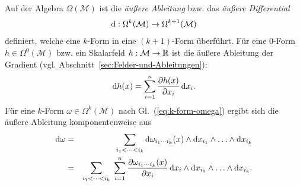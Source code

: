 Auf der Algebra $\Omega(\mathcal{M})$ ist die \emph{äußere Ableitung}
bzw. das \emph{äußere Differential}
\[
{\mathrm{d}}:\Omega^{k}(\mathcal{M})\to\Omega^{k+1}(\mathcal{M})
\]
definiert, welche eine $k$-Form in eine $(k+1)$-Form überführt.
Für eine $0$-Form $h\in\Omega^{0}(\mathcal{M})$ bzw. ein Skalarfeld
$h:\mathcal{M}\to{\mathbb{R}}$ ist die äußere Ableitung der Gradient (vgl.
Abschnitt~\ref{sec:Felder-und-Ableitungen}): 
\begin{equation}
{\mathrm{d}} h(x)=\sum_{i=1}^{n}\frac{\partial h(x)}{\partial x_{i}}\,{\mathrm{d}} x_{i}.\label{eq:formen-ableitung-0-form}
\end{equation}
Für eine $k$-Form $\omega\in\Omega^{k}(\mathcal{M})$ nach Gl.~(\ref{eq:k-form-omega})
ergibt sich die äußere Ableitung komponentenweise aus 
\begin{eqnarray}
{\mathrm{d}}\omega & = & \sum_{i_{1}<\cdots<i_{k}}{\mathrm{d}}\omega_{i_{1}\cdots i_{k}}(x)\wedge{\mathrm{d}} x_{i_{1}}\wedge\ldots\wedge{\mathrm{d}} x_{i_{k}}\nonumber \\
 & = & \sum_{i_{1}<\cdots<i_{k}}\;\sum_{i=1}^{n}\frac{\partial\omega_{i_{1}\cdots i_{k}}(x)}{\partial x_{i}}\,{\mathrm{d}} x_{i}\wedge{\mathrm{d}} x_{i_{1}}\wedge\ldots\wedge{\mathrm{d}} x_{i_{k}}.\label{eq:formen-def-ableitung}
\end{eqnarray}


